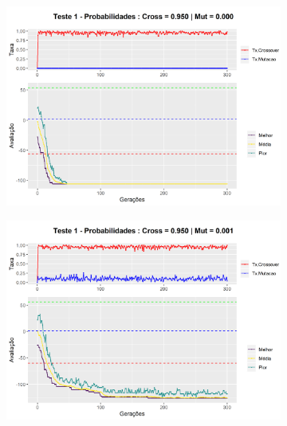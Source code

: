 \begin{figure}[ht]
	\centering
	\begin{subfigure}[b]{0.47\linewidth}
		\includegraphics[width=\linewidth]{imagens/graph_pc_0_950_pm_0_000_pop_50_g_300__1.png}
		\caption{}
	\end{subfigure}
	\begin{subfigure}[b]{0.47\linewidth}
		\includegraphics[width=\linewidth]{imagens/graph_pc_0_950_pm_0_001_pop_50_g_300__1.png}
		\caption{}
	\end{subfigure}
	\begin{subfigure}[b]{0.47\linewidth}

\end{subfigure}
\end{figure}
